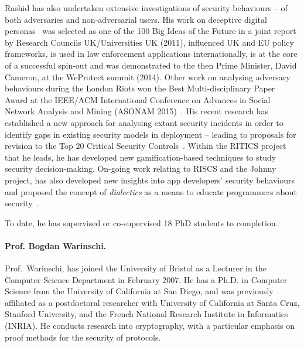 \documentclass[10pt]{article}
\begin{document}
Rashid has also undertaken extensive investigations of security behaviours -- of both adversaries and non-adversarial users.
His work on deceptive digital personas~\cite{rashid2013} was selected as one of the 100 Big Ideas of the Future in a joint report by Research Councils UK/Universities UK (2011), influenced UK and EU policy frameworks, is used in law enforcement applications internationally, is at the core of a successful spin-out and was demonstrated to the then Prime Minister, David Cameron, at the WeProtect summit (2014). Other work on analysing adversary behaviours during the London Riots won the Best Multi-disciplinary Paper Award at the IEEE/ACM International Conference on Advances in Social Network Analysis and Mining (ASONAM 2015)~\cite{charitonidis2015}. His recent research has established a new approach for analysing extant security incidents in order to identify gaps in existing security models in deployment -- leading to proposals for revision to the Top 20 Critical Security Controls~\cite{rashid2016}. Within the RITICS project that he leads, he has developed new gamification-based techniques to study security decision-making. On-going work relating to RISCS and the Johnny project, has also developed new insights into app developers' security behaviours~\cite{weir2016} and proposed the concept of \textit{dialectics} as a means to educate programmers about security~\cite{weir2017}.  

To date, he has supervised or co-supervised 18 PhD students to completion.

\vspace{.5cm}


\paragraph{Prof. Bogdan Warinschi.}
Prof.~Warinschi, has joined the University of 
Bristol as a Lecturer in the Computer Science Department in February 2007. 
He has a Ph.D. in Computer Science from the University of California
at San Diego, and was previously affiliated as a postdoctoral researcher with
University of California at Santa Cruz, Stanford University, and the
French National Research Institute in Informatics (INRIA).
He conducts research into cryptography, with a particular emphasis on
proof methods for the security of protocols.
\end{document}
